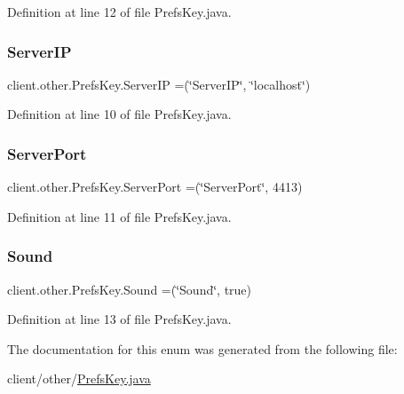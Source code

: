 Definition at line 12 of file Prefs\+Key.\+java.

\hypertarget{enumclient_1_1other_1_1_prefs_key_afb3297cc8cba1e49ec031c14e115feb8}{}\label{enumclient_1_1other_1_1_prefs_key_afb3297cc8cba1e49ec031c14e115feb8} 
\subsubsection{\texorpdfstring{Server\+IP}{ServerIP}}
{\footnotesize\ttfamily client.\+other.\+Prefs\+Key.\+Server\+IP =(\char`\"{}Server\+IP\char`\"{}, \char`\"{}localhost\char`\"{})}



Definition at line 10 of file Prefs\+Key.\+java.

\hypertarget{enumclient_1_1other_1_1_prefs_key_a967610c3389ceac5034551d3f69c564c}{}\label{enumclient_1_1other_1_1_prefs_key_a967610c3389ceac5034551d3f69c564c} 
\subsubsection{\texorpdfstring{Server\+Port}{ServerPort}}
{\footnotesize\ttfamily client.\+other.\+Prefs\+Key.\+Server\+Port =(\char`\"{}Server\+Port\char`\"{}, 4413)}



Definition at line 11 of file Prefs\+Key.\+java.

\hypertarget{enumclient_1_1other_1_1_prefs_key_a8ad253d1a3c77e65df307909afb7f52f}{}\label{enumclient_1_1other_1_1_prefs_key_a8ad253d1a3c77e65df307909afb7f52f} 
\subsubsection{\texorpdfstring{Sound}{Sound}}
{\footnotesize\ttfamily client.\+other.\+Prefs\+Key.\+Sound =(\char`\"{}Sound\char`\"{}, true)}



Definition at line 13 of file Prefs\+Key.\+java.



The documentation for this enum was generated from the following file\+:\begin{DoxyCompactItemize}
\item 
client/other/\hyperlink{client_2other_2_prefs_key_8java}{Prefs\+Key.\+java}\end{DoxyCompactItemize}
